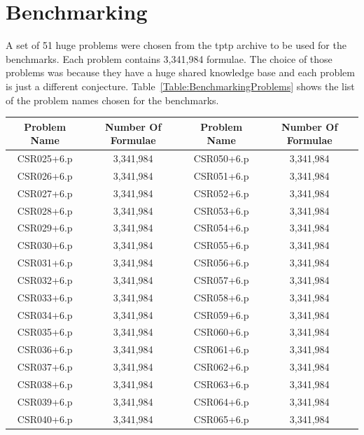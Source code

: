 \chapter{Benchmarking}

A set of 51 huge problems were chosen from the \ac{tptp} archive to be used for the benchmarks. Each problem contains 3,341,984 formulae. The choice of those problems was because they have a huge shared knowledge base and each problem is just a different conjecture. Table~\ref{Table:BenchmarkingProblems} shows the list of the problem names chosen for the benchmarks.
\begin{table}[ht]
  \begin{center}
    \begin{tabular}{c|c||c|c}
      \toprule
      Problem Name & Number Of Formulae & Problem Name & Number Of Formulae \\
      \midrule
      CSR025+6.p   & 3,341,984          & CSR050+6.p   & 3,341,984 \\
      CSR026+6.p   & 3,341,984          & CSR051+6.p   & 3,341,984 \\
      CSR027+6.p   & 3,341,984          & CSR052+6.p   & 3,341,984 \\
      CSR028+6.p   & 3,341,984          & CSR053+6.p   & 3,341,984 \\
      CSR029+6.p   & 3,341,984          & CSR054+6.p   & 3,341,984 \\
      CSR030+6.p   & 3,341,984          & CSR055+6.p   & 3,341,984 \\
      CSR031+6.p   & 3,341,984          & CSR056+6.p   & 3,341,984 \\
      CSR032+6.p   & 3,341,984          & CSR057+6.p   & 3,341,984 \\
      CSR033+6.p   & 3,341,984          & CSR058+6.p   & 3,341,984 \\
      CSR034+6.p   & 3,341,984          & CSR059+6.p   & 3,341,984 \\
      CSR035+6.p   & 3,341,984          & CSR060+6.p   & 3,341,984 \\
      CSR036+6.p   & 3,341,984          & CSR061+6.p   & 3,341,984 \\
      CSR037+6.p   & 3,341,984          & CSR062+6.p   & 3,341,984 \\
      CSR038+6.p   & 3,341,984          & CSR063+6.p   & 3,341,984 \\
      CSR039+6.p   & 3,341,984          & CSR064+6.p   & 3,341,984 \\
      CSR040+6.p   & 3,341,984          & CSR065+6.p   & 3,341,984 \\

\end{tabular}
\end{center}
\end{table}
